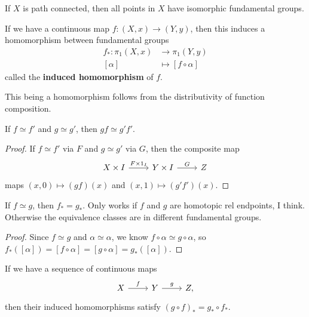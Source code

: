 \documentclass[twoside,10pt]{report}
\begin{document}
\begin{cor}
If $X$ is path connected, then all points in $X$ have isomorphic fundamental groups.
\end{cor}

\begin{defn}[]
If we have a continuous map $f:(X,x)\to (Y,y)$, then this induces a homomorphism between fundamental groups
\begin{align*}
	f_{*}:\pi_1(X,x)&\to \pi_1(Y,y)\\
	[\alpha]&\mapsto [f\circ \alpha]
\end{align*}
called the \textbf{induced homomorphism} of $f$.
\end{defn}
This being a homomorphism follows from the distributivity of function composition.

\begin{prop}
If $f \simeq f'$ and $g \simeq g'$, then $gf \simeq g'f'$.
\end{prop}
\begin{proof}
If $f \simeq f'$ via $F$ and $g \simeq g'$ via $G$, then the composite map
\[
\begin{tikzcd}
	X\times I\rar{F\times 1_{I}} & Y\times I \rar{G} & Z
\end{tikzcd}
\] 
maps $(x,0) \mapsto (gf)(x)$ and $(x,1)\mapsto (g'f')(x)$.
\end{proof}

\begin{cor}
If $f \simeq g$, then $f_{*}=g_{*}$.
{\color{red}Only works if $f$ and $g$ are homotopic rel endpoints, I think. Otherwise the equivalence classes are in different fundamental groups.}
\end{cor}
\begin{proof}
	Since $f \simeq g$ and $\alpha \simeq \alpha$, we know $f\circ \alpha \simeq g\circ \alpha$, so $f_{*}([\alpha]) = [f\circ \alpha] = [g\circ \alpha]=g_{*}([\alpha])$.
\end{proof}

\begin{prop}
If we have a sequence of continuous maps
\[
	\begin{tikzcd}
		X\rar{f}&Y\rar{g}&Z,
	\end{tikzcd}
\] 
then their induced homomorphisms satisfy $(g\circ f)_{*}=g_{*}\circ f_{*}$.
\end{prop}
\end{document}
